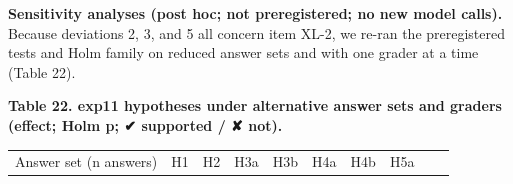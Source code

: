 \documentclass[10pt]{article}
\begin{document}
\textbf{Sensitivity analyses (post hoc; not preregistered; no new model calls).} Because deviations 2, 3, and 5 all concern item XL-2, we re-ran the preregistered tests and Holm family on reduced answer sets and with one grader at a time (Table 22).

\textbf{Table 22. exp11 hypotheses under alternative answer sets and graders (effect; Holm p; ✔ supported / ✘ not).}

{\def\LTcaptype{none} %
\begin{longtable}[]{@{}
  >{\raggedright\arraybackslash}p{}
  >{\raggedright\arraybackslash}p{}
  >{\raggedright\arraybackslash}p{}
  >{\raggedright\arraybackslash}p{}
  >{\raggedright\arraybackslash}p{}
  >{\raggedright\arraybackslash}p{}
  >{\raggedright\arraybackslash}p{}
  >{\raggedright\arraybackslash}p{}
  >{\raggedright\arraybackslash}p{}
  >{\raggedright\arraybackslash}p{}@{}}
\toprule\noalign{}
\begin{minipage}[b]{\linewidth}\raggedright
Answer set (n answers)
\end{minipage} & \begin{minipage}[b]{\linewidth}\raggedright
H1
\end{minipage} & \begin{minipage}[b]{\linewidth}\raggedright
H2
\end{minipage} & \begin{minipage}[b]{\linewidth}\raggedright
H3a
\end{minipage} & \begin{minipage}[b]{\linewidth}\raggedright
H3b
\end{minipage} & \begin{minipage}[b]{\linewidth}\raggedright
H4a
\end{minipage} & \begin{minipage}[b]{\linewidth}\raggedright
H4b
\end{minipage} & \begin{minipage}[b]{\linewidth}\raggedright
H5a
\end{minipage} & \begin{minipage}[b]{\linewidth}\raggedright

\end{minipage}
\end{longtable}}
\end{document}
